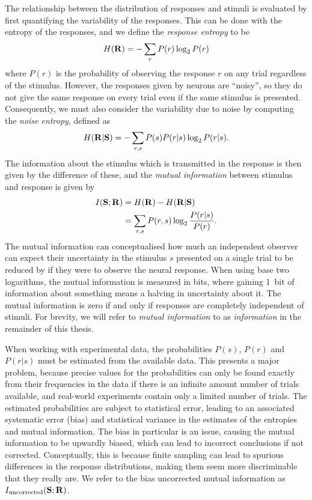 The relationship between the distribution of responses and stimuli is evaluated by first quantifying the variability of the responses.
This can be done with the entropy \citep{Shannon1948} of the responses, and we define the \textit{response entropy} to be
\begin{equation}
H( \mathbf{R} )
= - \sum_{r} P(r) \log_2 P(r)
\end{equation}
where $P(r)$ is the probability of observing the response $r$ on any trial regardless of the stimulus.
However, the responses given by neurons are ``noisy'', so they do not give the same response on every trial even if the same stimulus is presented.
Consequently, we must also consider the variability due to noise by computing the \textit{noise entropy}, defined as
\begin{equation}
H( \mathbf{R} | \mathbf{S} )
= - \sum_{r,s} P(s) P(r|s) \log_2 P(r|s)
.\end{equation}
The information about the stimulus which is transmitted in the response is then given by the difference of these, and the \textit{mutual information} between stimulus and response is given by
\begin{align}
I( \mathbf{S} ; \mathbf{R} )
&= H( \mathbf{R} ) - H( \mathbf{R} | \mathbf{S} ) \notag \\
&= \sum_{r,s} P(r,s) \log_2 \frac{P(r|s)}{P(r)}
.\end{align}
The mutual information can conceptualised how much an independent observer can expect their uncertainty in the stimulus $s$ presented on a single trial to be reduced by if they were to observe the neural response.
When using base two logarithms, the mutual information is measured in bits, where gaining \SI{1}{bit} of information about something means a halving in uncertainty about it.
The mutual information is zero if and only if responses are completely independent of stimuli.
For brevity, we will refer to \textit{mutual information} to as \textit{information} in the remainder of this thesis.

When working with experimental data, the probabilities $P(s)$, $P(r)$ and $P(r|s)$ must be estimated from the available data.
This presents a major problem, because precise values for the probabilities can only be found exactly from their frequencies in the data if there is an infinite amount number of trials available, and real-world experiments contain only a limited number of trials.
The estimated probabilities are subject to statistical error, leading to an associated systematic error (bias) and statistical variance in the estimates of the entropies and mutual information.
The bias in particular is an issue, causing the mutual information to be upwardly biased, which can lead to incorrect conclusions if not corrected.
Conceptually, this is because finite sampling can lead to spurious differences in the response distributions, making them seem more discriminable that they really are.
We refer to the bias uncorrected mutual information as $I_{\text{uncorrected}}(\mathbf{S};\mathbf{R})$.

